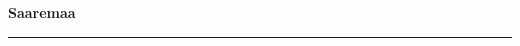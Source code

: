 \documentclass[10pt]{book}
\begin{document}
{
  \samepage
  \raggedbottom
  \raggedright
  \sloppy


  \vspace{0.2in}

  \noindent\begin{minipage}{.1\textwidth}
    \hfill\vspace{0.1in}
  \end{minipage}%
  \noindent\begin{minipage}{.8\textwidth}
    \centering
    \bfseries
    \large Saaremaa
  \end{minipage}%
  \noindent\begin{minipage}{.1\textwidth}
      \hfill\vspace{0.1in}
  \end{minipage}

  \nopagebreak[4]
  \vspace{0.1in}
  \nopagebreak[4]
  \hrule height 0.05ex
  \nopagebreak[4]
  \vspace{-0.05in}




}
\end{document}
